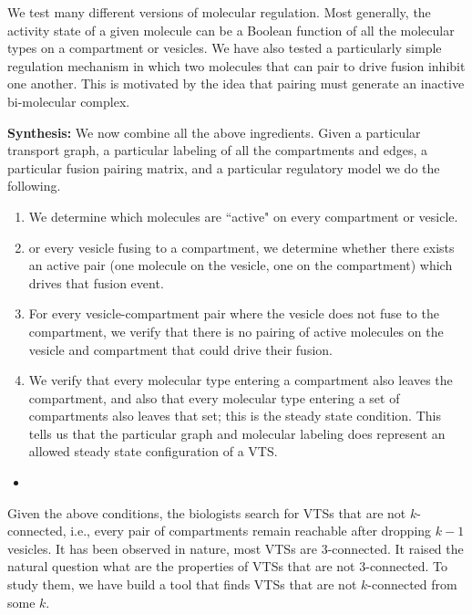 We test many different versions of molecular
regulation.
%
Most generally, the activity state of a given molecule can be a
Boolean function of all the molecular types on a compartment or vesicles.
We have also tested a particularly simple regulation mechanism in which two
molecules that can pair to drive fusion inhibit one another.
%
This is motivated by the idea that pairing must generate an inactive
bi-molecular complex.

\textbf{Synthesis:} We now combine all the above ingredients.
%
Given a particular
transport graph, a particular labeling of all the compartments and edges,
a particular fusion pairing matrix, and a particular regulatory model we do
the following.
\begin{enumerate}
\item We determine which molecules are ``active" on every
compartment or vesicle.
\item or every vesicle fusing to a compartment, we
determine whether there exists an active pair (one molecule on the vesicle,
one on the compartment) which drives that fusion event.
\item For every vesicle-compartment pair where the vesicle does not fuse to the
compartment, we verify that there is no pairing of active molecules on the
vesicle and compartment that could drive their fusion.
\item We verify that every molecular type entering a compartment also leaves the compartment,
and also that every molecular type entering a set of compartments also
leaves that set; this is the steady state condition.
%
This tells us that the
particular graph and molecular labeling does represent an allowed steady
state configuration of a VTS.
\end{enumerate}


\begin{itemize}
\item {}
\end{itemize}


Given the above conditions, the biologists search for VTSs that are
not $k$-connected, i.e., every pair of compartments remain reachable
after dropping $k-1$ vesicles.
%
It has been observed in nature, most VTSs are 3-connected.
%
It raised the natural question what are the properties of VTSs
that are not 3-connected.
%
To study them, we have build a tool that finds VTSs that are not
$k$-connected from some $k$.


